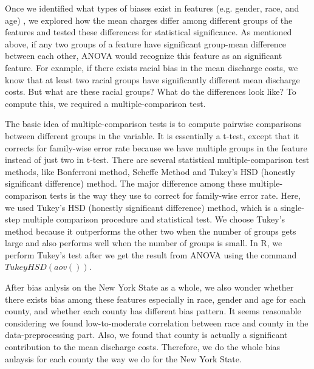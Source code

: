 \documentclass[10pt,twocolumn,letterpaper]{article}
\begin{document}

Once we identified what types of biases exist in features (e.g. gender, race, and age) , we explored how the mean charges differ among different groups of the features and tested these differences for statistical significance. As mentioned above, if any two groups of a feature have significant group-mean difference between each other, ANOVA would recognize this feature as an significant feature. For example, if there exists racial bias in the mean discharge costs, we know that at least two racial groups have significantly different mean discharge costs. But what are these racial groups? What do the differences look like? To compute this, we required a multiple-comparison test. 

The basic idea of multiple-comparison tests is to compute pairwise comparisons between different groups in the variable. It is essentially a t-test, except that it corrects for family-wise error rate because we have multiple groups in the feature instead of just two in t-test. There are several statistical multiple-comparison test methods, like Bonferroni method, Scheffe Method and Tukey's HSD (honestly significant difference) method. The major difference among these multiple-comparison tests is the way they use to correct for family-wise error rate. Here, we used Tukey's HSD (honestly significant difference) method, which is a single-step multiple comparison procedure and statistical test. We choose Tukey's method because it outperforms the other two when the number of groups gets large and also performs well when the number of groups is small. In R, we perform Tukey's test after we get the result from ANOVA using the command $TukeyHSD(aov())$.

After bias anlysis on the New York State as a whole, we also wonder whether there exists bias among these features especially in race, gender and age for each county, and whether each county has different bias pattern. It seems reasonable considering we found low-to-moderate correlation between race and county in the data-preprocessing part. Also, we found that county is actually a significant contribution to the mean discharge costs. Therefore, we do the whole bias anlaysis for each county the way we do for the New York State. 

\end{document}
